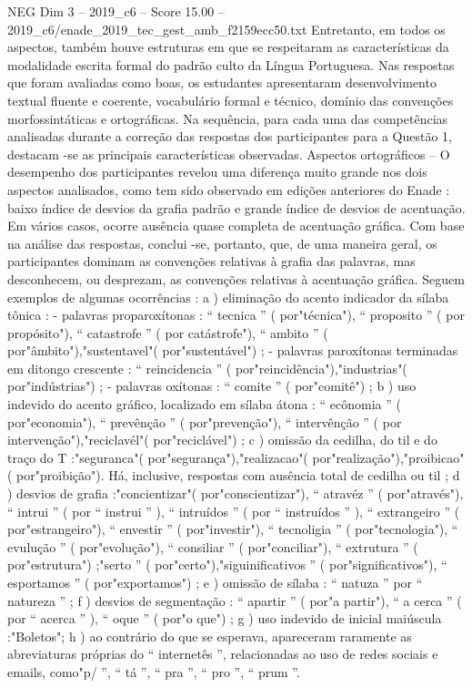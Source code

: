\begin{textsample}{NEG Dim 3 – 2019\_c6 – Score 15.00 – 2019\_c6/enade\_2019\_tec\_gest\_amb\_f2159ecc50.txt}
Entretanto, em todos os aspectos, também houve estruturas em que se respeitaram as características da modalidade escrita formal do padrão culto da Língua Portuguesa.
Nas respostas que foram avaliadas como boas, os estudantes apresentaram desenvolvimento textual fluente e coerente, vocabulário formal e técnico, domínio das convenções morfossintáticas e ortográficas.
Na sequência, para cada uma das competências analisadas durante a correção das respostas dos participantes para a Questão 1, destacam -se as principais características observadas.
Aspectos ortográficos – O desempenho dos participantes revelou uma diferença muito grande nos dois aspectos analisados, como tem sido observado em edições anteriores do Enade : baixo índice de desvios da grafia padrão e grande índice de desvios de acentuação.
Em vários casos, ocorre ausência quase completa de acentuação gráfica.
Com base na análise das respostas, conclui -se, portanto, que, de uma maneira geral, os participantes dominam as convenções relativas à grafia das palavras, mas desconhecem, ou desprezam, as convenções relativas à acentuação gráfica.
Seguem exemplos de algumas ocorrências : a ) eliminação do acento indicador da sílaba tônica : - palavras proparoxítonas : “ tecnica ” ( por"técnica"), “ proposito ” ( por propósito"), “ catastrofe ” ( por catástrofe"), “ ambito ” ( por"âmbito"),"sustentavel"( por"sustentável") ; - palavras paroxítonas terminadas em ditongo crescente : “ reincidencia ” ( por"reincidência"),"industrias"( por"indústrias") ; - palavras oxítonas : “ comite ” ( por"comitê") ; b ) uso indevido do acento gráfico, localizado em sílaba átona : “ ecônomia ” ( por"economia"), “ prevênção ” ( por"prevenção"), “ intervênção ” ( por intervenção"),"reciclavél"( por"reciclável") ; c ) omissão da cedilha, do til e do traço do T :"seguranca"( por"segurança"),"realizacao"( por"realização"),"proibicao"( por"proibição").
Há, inclusive, respostas com ausência total de cedilha ou til ; d ) desvios de grafia :"concientizar"( por"conscientizar"), “ atravéz ” ( por"através"), “ intrui ” ( por “ instrui ” ), “ intruídos ” ( por “ instruídos ” ), “ extrangeiro ” ( por"estrangeiro"), “ envestir ” ( por"investir"), “ tecnoligia ” ( por"tecnologia"), “ evulução ” ( por"evolução"), “ consiliar ” ( por"conciliar"), “ extrutura ” ( por"estrutura") ;"serto ” ( por"certo"),"siguinificativos ” ( por"significativos"), “ esportamos ” ( por"exportamos") ; e ) omissão de sílaba : “ natuza ” por “ natureza ” ; f ) desvios de segmentação : “ apartir ” ( por"a partir"), “ a cerca ” ( por “ acerca ” ), “ oque ” ( por"o que") ; g ) uso indevido de inicial maiúscula :"Boletos"; h ) ao contrário do que se esperava, apareceram raramente as abreviaturas próprias do “ internetês ”, relacionadas ao uso de redes sociais e emails, como"p/ ”, “ tá ”, “ pra ”, “ pro ”, “ prum ”.

\end{textsample}
